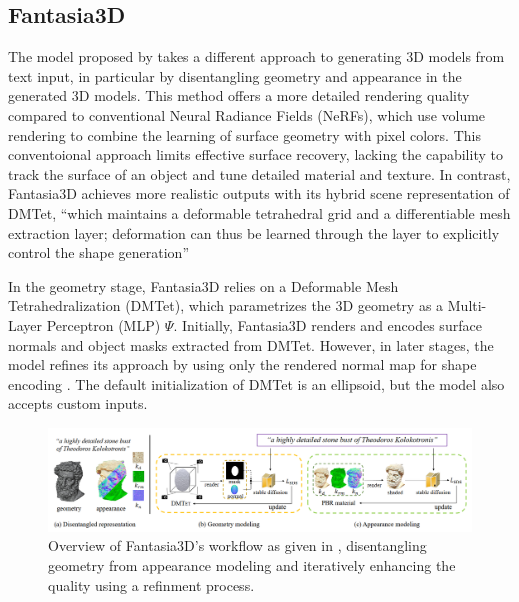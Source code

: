 \subsection{Fantasia3D}\label{fantasia3D}

The model proposed by \citeauthor{chen2023fantasia3d} takes a different approach to generating 3D models from text input, in particular by disentangling geometry and appearance in the generated 3D models.
This method offers a more detailed rendering quality compared to conventional Neural Radiance Fields (NeRFs), which use volume rendering to combine the learning of surface geometry with pixel colors. This conventoional approach limits effective surface recovery, lacking the capability to track the surface of an object and tune detailed material and texture. In contrast, Fantasia3D achieves more realistic outputs with its hybrid scene representation of DMTet, ``which maintains a deformable tetrahedral grid and a differentiable mesh extraction layer; deformation can thus be learned through the layer to explicitly control the shape generation'' \citep{chen2023fantasia3d}

In the geometry stage, Fantasia3D relies on a Deformable Mesh Tetrahedralization (DMTet), which parametrizes the 3D geometry as a Multi-Layer Perceptron (MLP) \(\Psi\). Initially, Fantasia3D renders and encodes surface normals and object masks extracted from DMTet. However, in later stages, the model refines its approach by using only the rendered normal map for shape encoding \citep{chen2023fantasia3d}. The default initialization of DMTet is an ellipsoid, but the model also accepts custom inputs.

\begin{figure}[ht]
  \centering
    \includegraphics[width=1\columnwidth]{figures/Fantasia3D.png}
    \caption{Overview of Fantasia3D's workflow as given in \citep{chen2023fantasia3d}, disentangling geometry from appearance modeling and iteratively enhancing the quality using a refinment process.}\label{fig:figureFantasia}
\end{figure}

